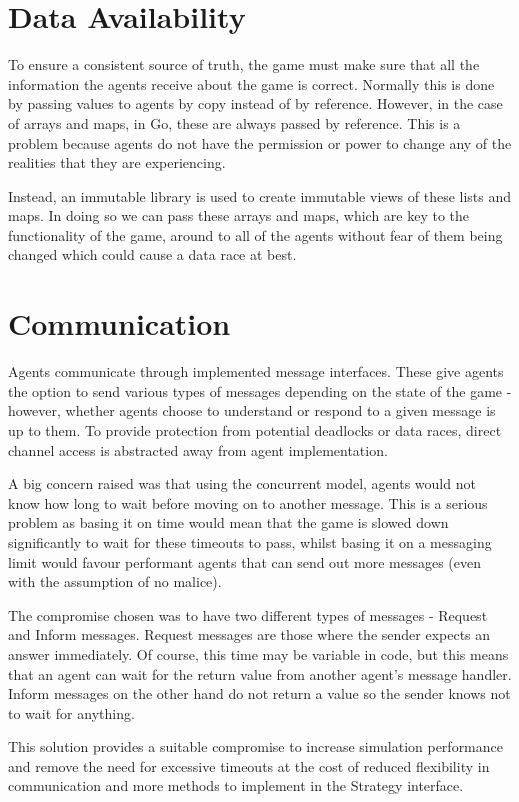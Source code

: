\section{Data Availability}
To ensure a consistent source of truth, the game must make sure that all the information the agents receive about the game is correct. Normally this is done by passing values to agents by copy instead of by reference. However, in the case of arrays and maps, in Go, these are always passed by reference. This is a problem because agents do not have the permission or power to change any of the realities that they are experiencing.

Instead, an immutable library is used to create immutable views of these lists and maps. In doing so we can pass these arrays and maps, which are key to the functionality of the game, around to all of the agents without fear of them being changed which could cause a data race at best.

\section{Communication}
Agents communicate through implemented message interfaces. These give agents the option to send various types of messages depending on the state of the game - however, whether agents choose to understand or respond to a given message is up to them. To provide protection from potential deadlocks or data races, direct channel access is abstracted away from agent implementation.

A big concern raised was that using the concurrent model, agents would not know how long to wait before moving on to another message. This is a serious problem as basing it on time would mean that the game is slowed down significantly to wait for these timeouts to pass, whilst basing it on a messaging limit would favour performant agents that can send out more messages (even with the assumption of no malice).

The compromise chosen was to have two different types of messages - Request and Inform messages. Request messages are those where the sender expects an answer immediately. Of course, this time may be variable in code, but this means that an agent can wait for the return value from another agent's message handler. Inform messages on the other hand do not return a value so the sender knows not to wait for anything.

This solution provides a suitable compromise to increase simulation performance and remove the need for excessive timeouts at the cost of reduced flexibility in communication and more methods to implement in the Strategy interface.

